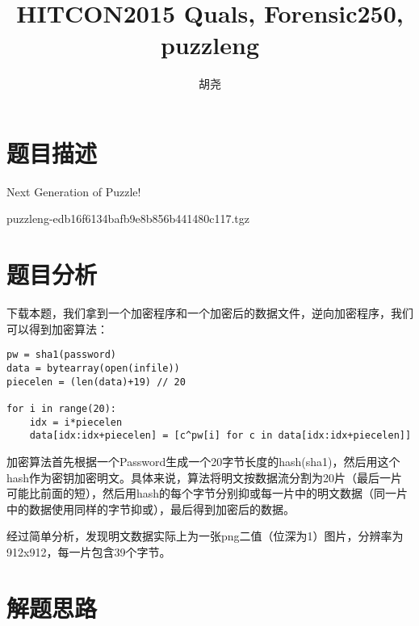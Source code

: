 \documentclass[a4paper,UTF8]{ctexart}
\title{HITCON2015 Quals, Forensic250, puzzleng}
\author{胡尧}
\affil{哈尔滨工业大学，计算机科学与技术学院，huyao@hit.edu.cn}
\date{}
\begin{document}
\maketitle



\section{题目描述}

\begin{quizdesc}[label=Forensic 250 puzzleng]
Next Generation of Puzzle!

puzzleng-edb16f6134bafb9e8b856b441480c117.tgz
\end{quizdesc}

\section{题目分析}

  下载本题，我们拿到一个加密程序和一个加密后的数据文件，逆向加密程序，我们可以得到加密算法：

\begin{verbatim}
pw = sha1(password)
data = bytearray(open(infile))
piecelen = (len(data)+19) // 20

for i in range(20):
    idx = i*piecelen
    data[idx:idx+piecelen] = [c^pw[i] for c in data[idx:idx+piecelen]]

\end{verbatim}

  加密算法首先根据一个Password生成一个20字节长度的hash(sha1)，然后用这个hash作为密钥加密明文。具体来说，算法将明文按数据流分割为20片（最后一片可能比前面的短），然后用hash的每个字节分别抑或每一片中的明文数据（同一片中的数据使用同样的字节抑或），最后得到加密后的数据。

  经过简单分析，发现明文数据实际上为一张png二值（位深为1）图片，分辨率为912x912，每一片包含39个字节。

\section{解题思路}
\end{document}
